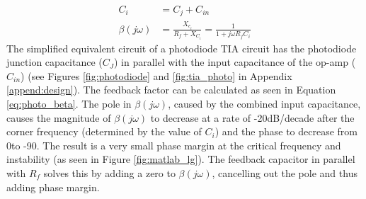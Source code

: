 \begin{align}
    C_i &= C_j+C_{in} \\
    \beta (j\omega) &= \frac{X_{c_i}}{R_f + X_{C_i}} = \frac{1}{1+j\omega R_fC_i} \label{eq:photo_beta}
\end{align}
The simplified equivalent circuit of a photodiode TIA circuit has the photodiode junction capacitance ($C_J$) in parallel with the input capacitance of the op-amp ($C_{in}$) (see Figures \ref{fig:photodiode} and \ref{fig:tia_photo} in Appendix \ref{append:design}). The feedback factor can be calculated as seen in Equation \ref{eq:photo_beta}. The pole in $\beta(j\omega)$, caused by the combined input capacitance, causes the magnitude of $\beta(j\omega)$ to decrease at a rate of -20dB/decade after the corner frequency (determined by the value of $C_{i}$) and the phase to decrease from 0\textdegree to -90\textdegree. The result is a very small phase margin at the critical frequency and instability (as seen in Figure \ref{fig:matlab_lg}). The feedback capacitor in parallel with $R_f$ solves this by adding a zero to $\beta(j\omega)$, cancelling out the pole and thus adding phase margin.

